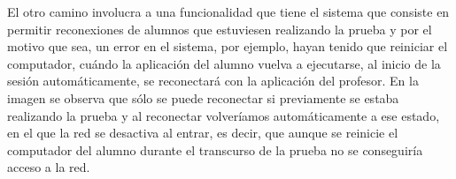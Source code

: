 El otro camino involucra a una funcionalidad que tiene el sistema que consiste en permitir reconexiones de alumnos que estuviesen realizando la prueba y por el motivo que sea, un error en el sistema, por ejemplo, hayan tenido que reiniciar el computador, cuándo la aplicación del alumno vuelva a ejecutarse, al inicio de la sesión automáticamente, se reconectará con la aplicación del profesor. En la imagen se observa que sólo se puede reconectar si previamente se estaba realizando la prueba y al reconectar volveríamos automáticamente a ese estado, en el que la red se desactiva al entrar, es decir, que aunque se reinicie el computador del alumno durante el transcurso de la prueba no se conseguiría acceso a la red.
\newline




